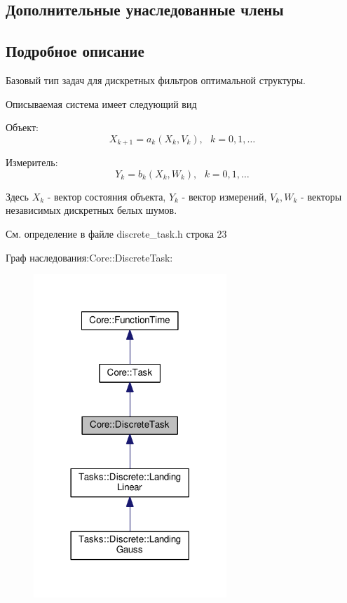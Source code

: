 \subsection*{Дополнительные унаследованные члены}


\subsection{Подробное описание}
Базовый тип задач для дискретных фильтров оптимальной структуры. 

Описываемая система имеет следующий вид


\begin{DoxyItemize}
\item Объект\+: \[X_{k+1} = a_k(X_k, V_k),\ \ \ k = 0, 1, \ldots\]
\item Измеритель\+: \[Y_k = b_k(X_k, W_k),\ \ \ k = 0, 1, \ldots\]
\end{DoxyItemize}

Здесь $X_k$ -\/ вектор состояния объекта, $Y_k$ -\/ вектор измерений, $V_k, W_k$ -\/ векторы независимых дискретных белых шумов. 

См. определение в файле discrete\+\_\+task.\+h строка 23



Граф наследования\+:Core\+:\+:Discrete\+Task\+:
\nopagebreak
\begin{figure}[H]
\begin{center}
\leavevmode
\includegraphics[width=206pt]{class_core_1_1_discrete_task__inherit__graph}
\end{center}
\end{figure}


